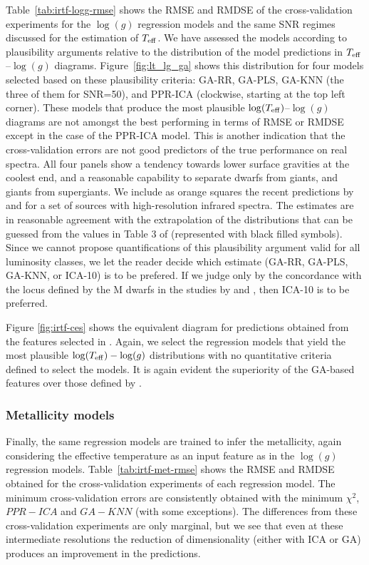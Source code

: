Table~\ref{tab:irtf-logg-rmse} shows the RMSE and RMDSE of the
cross-validation experiments for the $\log(g)$ regression models and
the same SNR regimes discussed for the estimation of $T_{\rm eff}$. We
have assessed the models according to plausibility arguments relative
to the distribution of the model predictions in $T_{\rm
eff}$--$\log(g)$ diagrams.  Figure~\ref{fig:lt_lg_ga} shows this
distribution for four models selected based on these plausibility
criteria: GA-RR, GA-PLS, GA-KNN (the three of them for SNR=50), and
PPR-ICA (clockwise, starting at the top left corner). These models
that produce the most plausible $\log(T_{\rm eff})$--$\log(g)$
diagrams are not amongst the best performing in terms of RMSE or RMDSE
except in the case of the PPR-ICA model. This is another indication
that the cross-validation errors are not good predictors of the true
performance on real spectra.  All four panels show a tendency towards
lower surface gravities at the coolest end, and a reasonable
capability to separate dwarfs from giants, and giants from
supergiants. We include as orange squares the recent predictions
by \cite{esm1} and \cite{esm2} for a set of sources with
high-resolution infrared spectra. The estimates are in reasonable
agreement with the extrapolation of the distributions that can be
guessed from the values in Table 3 of \cite{cesetti} (represented with
black filled symbols). Since we cannot propose quantifications of this
plausibility argument valid for all luminosity classes, we let the
reader decide which estimate (GA-RR, GA-PLS, GA-KNN, or ICA-10) is to
be prefered. If we judge only by the concordance with the locus
defined by the M dwarfs in the studies by \cite{esm1} and \cite{esm2},
then ICA-10 is to be preferred.

Figure \ref{fig:irtf-ces} shows the equivalent diagram for predictions
obtained from the features selected in \cite{cesetti}. Again, we
select the regression models that yield the most plausible
$\log(T_{\rm eff})-\log(g)$ distributions with no quantitative
criteria defined to select the models. It is again evident the
superiority of the GA-based features over those defined
by \cite{cesetti}.

\subsubsection{Metallicity models} 
\label{sect:irtf-met}

Finally, the same regression models are trained to infer the
metallicity, again considering the effective temperature as an input
feature as in the $\log(g)$ regression
models. Table~\ref{tab:irtf-met-rmse} shows the RMSE and RMDSE
obtained for the cross-validation experiments of each regression
model. The minimum cross-validation errors are consistently obtained
with the minimum $\chi^2$, $PPR-ICA$ and $GA-KNN$ (with some
exceptions). The differences from these cross-validation experiments
are only marginal, but we see that even at these intermediate
resolutions the reduction of dimensionality (either with ICA or GA)
produces an improvement in the predictions.

